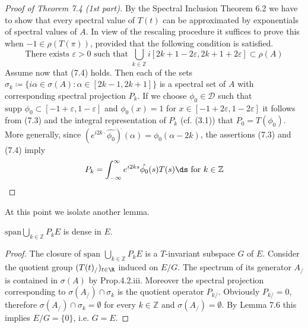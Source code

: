 \begin{proof}[Proof of Theorem 7.4 (1st part)]
By the Spectral Inclusion Theorem 6.2 we have to show that every spectral value of $T(t)$ can be approximated by exponentials of spectral values of $A$.
In view of the rescaling procedure it suffices to prove this when $-1 \in \rho(T(\pi))$, provided that the following condition is satisfied.
\begin{equation}\label{eq:a3-7.5}
\text{There exists } \varepsilon > 0 \text{ such that } \bigcup_{k\in\mathbb{Z}} i[2k+1-2\varepsilon,2k+1+2\varepsilon] \subset \rho(A)
\end{equation}
Assume now that (7.4) holds.
Then each of the sets $\sigma_{k}\coloneqq \{i\alpha \in \sigma(A) \colon \alpha \in [2k-1,2k+1]\}$ is a spectral set of $A$ with corresponding spectral projection $P_{k}$.
If we choose $\phi_{0} \in \mathcal{D}$ such that $\text{supp }\phi_{0} \subset [-1+\varepsilon,1-\varepsilon]$ and $\phi_{0}(x) = 1$ for $x \in [-1+2\varepsilon,1-2\varepsilon]$ it follows from (7.3) and the integral representation of $P_{k}$ (cf. (3.1)) that $P_{0} = T(\phi_{0})$.
More generally, since $(e^{i2k\cdot}\hat{\phi_{0}})^{\check{}}(\alpha) = \phi_{0}(\alpha-2k)$, the assertions (7.3) and (7.4) imply
\begin{equation}\label{eq:a3-7.6}
P_{k} = \int_{-\infty}^{\infty} e^{i2ks}\hat{\phi_{0}}(s)T(s)\ds \text{ for } k \in \mathbb{Z}
\end{equation}
\end{proof}

At this point we isolate another lemma.
\begin{lemma}\label{lem:a3-7.7}
$\mathrm{span }\bigcup_{k\in\mathbb{Z}} P_{k}E$ is dense in $E$.
\end{lemma}
\begin{proof}
The closure of $\text{span }\bigcup_{k\in\mathbb{Z}} P_{k}E$ is a $T$-invariant subspace $G$ of $E$.
Consider the quotient group $(T(t)_/)_{t\in\R}$ induced on $E/G$.
The spectrum of its generator $A_{/}$ is contained in $\sigma(A)$ by Prop.4.2.iii.
Moreover the spectral projection corresponding to $\sigma(A_{/}) \cap \sigma_{k}$ is the quotient operator $P_{k/}$.
Obviously $P_{k/} = 0$, therefore $\sigma(A_{/}) \cap \sigma_{k} = \emptyset$ for every $k \in \mathbb{Z}$ and $\sigma(A_{/}) = \emptyset$.
By Lemma 7.6 this implies $E/G = \{0\}$, i.e. $G = E$.
\end{proof}

